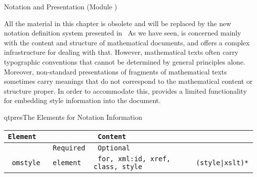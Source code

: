 
\begin{omgroup}[creators=miko,short={Notation and Presentation},id=pres]
                          {Notation and Presentation (Module {})}

\begin{module}[id=presintro]
\begin{oldpart}{All the material in this chapter is obsolete and will be replaced by the
    new notation definition system presented in~\cite{KMR:NoLMD08}}
  As we have seen, {\omdoc} is concerned mainly with the content and structure of
  mathematical documents, and offers a complex infrastructure for dealing with that.
  However, mathematical texts often carry typographic conventions that cannot be
  determined by general principles alone. Moreover, non-standard presentations of
  fragments of mathematical texts sometimes carry meanings that do not correspond to the
  mathematical content or structure proper. In order to accommodate this, {\omdoc}
  provides a limited functionality for embedding style information into the document.

\begin{presonly}
\begin{myfig}{qtpres}{The {\omdoc} Elements for Notation Information}
\begin{scriptsize}
\begin{tabular}{|>{\tt}l|>{\tt}l|>{\tt}p{}|>{\tt}p{}|}\hline
{\rm Element}& \multicolumn{2}{l|}{Attributes\hspace*{2.25cm}} & Content  \\\hline
             & {\rm Required}  & {\rm Optional}     &           \\\hline\hline
 omstyle    & element & for, xml:id, xref, class, style & (style|xslt)* \\\hline
\end{tabular}
\end{scriptsize}
\end{myfig}
\end{presonly}


\end{oldpart}
\end{module}
\end{omgroup}
